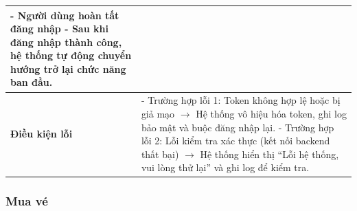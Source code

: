 \begin{longtable}{|p{}|p{}|}
\hspace*{1em}- Người dùng hoàn tất đăng nhập \newline
\hspace*{1em}- Sau khi đăng nhập thành công, hệ thống tự động chuyển hướng trở lại chức năng ban đầu. \\ \hline
\textbf{Điều kiện lỗi} &
- Trường hợp lỗi 1: Token không hợp lệ hoặc bị giả mạo $\rightarrow$ Hệ thống vô hiệu hóa token, ghi log bảo mật và buộc đăng nhập lại. \newline
- Trường hợp lỗi 2: Lỗi kiểm tra xác thực (kết nối backend thất bại) $\rightarrow$ Hệ thống hiển thị “Lỗi hệ thống, vui lòng thử lại” và ghi log để kiểm tra. \\ \hline
\end{longtable}
\vspace{15pt}

\subsubsection{Mua vé}


